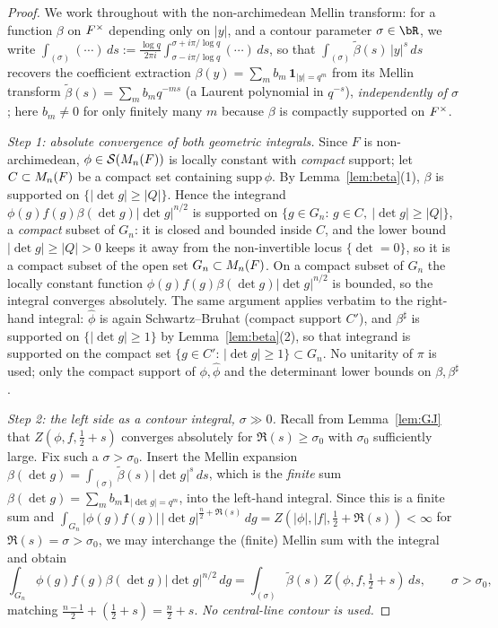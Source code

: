 \begin{proof}
We work throughout with the non-archimedean Mellin transform: for a function $\beta$ on
$F^\times$ depending only on $|y|$, and a contour parameter $\sigma\in\bR$, we write
$\int_{(\sigma)}(\cdots)\,ds:=\frac{\log q}{2\pi i}\int_{\sigma-i\pi/\log q}^{\sigma+i\pi/\log q}(\cdots)\,ds$,
so that $\int_{(\sigma)}\tilde\beta(s)\,|y|^{s}\,ds$ recovers the coefficient extraction
$\beta(y)=\sum_{m}b_m\,\mathbf 1_{|y|=q^{m}}$ from its Mellin transform
$\tilde\beta(s)=\sum_m b_m q^{-ms}$ (a Laurent polynomial in $q^{-s}$), \emph{independently of
$\sigma$}; here $b_m\ne0$ for only finitely many $m$ because $\beta$ is compactly supported on
$F^\times$.

\smallskip
\emph{Step 1: absolute convergence of both geometric integrals.} Since $F$ is
non-archimedean, $\phi\in\mathcal{S}(M_n(F))$ is locally constant with \emph{compact}
support; let $C\subset M_n(F)$ be a compact set containing $\mathrm{supp}\,\phi$.
By Lemma~\ref{lem:beta}(1), $\beta$ is supported on $\{|\det g|\ge|Q|\}$. Hence the integrand
$\phi(g)f(g)\beta(\det g)|\det g|^{n/2}$ is supported on
$\{g\in G_n:\,g\in C,\ |\det g|\ge|Q|\}$, a \emph{compact} subset of $G_n$: it is
closed and bounded inside $C$, and the lower bound $|\det g|\ge|Q|>0$ keeps it away from the
non-invertible locus $\{\det=0\}$, so it is a compact subset of the open set
$G_n\subset M_n(F)$. On a compact subset of $G_n$ the locally constant function
$\phi(g)f(g)\beta(\det g)|\det g|^{n/2}$ is bounded, so the integral converges absolutely. The
same argument applies verbatim to the right-hand integral: $\widehat\phi$ is again
Schwartz--Bruhat (compact support $C'$), and $\beta^\sharp$ is supported on $\{|\det g|\ge1\}$
by Lemma~\ref{lem:beta}(2), so that integrand is supported on the compact set
$\{g\in C':\,|\det g|\ge1\}\subset G_n$. No unitarity of $\pi$ is used; only the compact support
of $\phi,\widehat\phi$ and the determinant lower bounds on $\beta,\beta^\sharp$.

\smallskip
\emph{Step 2: the left side as a contour integral, $\sigma\gg0$.} Recall from
Lemma~\ref{lem:GJ} that $Z(\phi,f,\tfrac12+s)$ converges absolutely for $\Re(s)\ge\sigma_0$ with
$\sigma_0$ sufficiently large. Fix such a $\sigma>\sigma_0$. Insert the Mellin expansion
$\beta(\det g)=\int_{(\sigma)}\tilde\beta(s)|\det g|^{s}\,ds$, which is the \emph{finite} sum
$\beta(\det g)=\sum_m b_m\mathbf 1_{|\det g|=q^{m}}$, into the left-hand integral. Since this is
a finite sum and $\int_{G_n}|\phi(g)f(g)|\,|\det g|^{\frac n2+\Re(s)}\,dg
=Z(|\phi|,|f|,\tfrac12+\Re(s))<\infty$ for $\Re(s)=\sigma>\sigma_0$, we may interchange the
(finite) Mellin sum with the integral and obtain
\[
\int_{G_n}\phi(g)f(g)\beta(\det g)|\det g|^{n/2}\,dg
=\int_{(\sigma)}\tilde\beta(s)\,Z(\phi,f,\tfrac12+s)\,ds ,\qquad \sigma>\sigma_0,
\tag{$\ast$}
\]
matching $\tfrac{n-1}{2}+(\tfrac12+s)=\tfrac n2+s$. \emph{No central-line contour is used.}


\end{proof}
